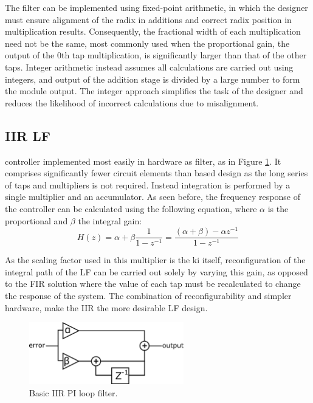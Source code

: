 The filter can be implemented using fixed-point arithmetic, in which the designer must ensure alignment of the radix in additions and correct radix position in multiplication results. Consequently, the fractional width of each multiplication need not be the same, most commonly used when the proportional gain, the output of the 0th tap multiplication, is significantly larger than that of the other taps. Integer arithmetic instead assumes all calculations are carried out using integers, and output of the addition stage is divided by a large number to form the module output. The integer approach simplifies the task of the designer and reduces the likelihood of incorrect calculations due to misalignment.

\subsection{\acs{IIR} \acl{LF}}
 controller implemented most easily in hardware as  filter, as in Figure \ref{fig:iir_pi}. It comprises significantly fewer circuit elements than  based design as the long series of taps and multipliers is not required. Instead integration is performed by a single multiplier and an accumulator. As seen before, the frequency response of the controller can be calculated using the following equation, where $\alpha$ is the proportional and $\beta$ the integral gain:
\begin{equation*}
	H(z) = \alpha + \beta\frac{1}{1-z^{-1}} = \frac{(\alpha + \beta) - \alpha z^{-1}}{1-z^{-1}}
\end{equation*}

As the scaling factor used in this multiplier is the \ac{ki} itself, reconfiguration of the integral path of the \acl{LF} can be carried out solely by varying this gain, as opposed to the \ac{FIR} solution where the value of each tap must be recalculated to change the response of the system. The combination of reconfigurability and simpler hardware, make the \ac{IIR} the more desirable \ac{LF} design.
\begin{figure}[h]
	\centering
	\includegraphics[width=0.6\textwidth]{../simple_pi.pdf}
	\caption[Basic \ac{IIR} \ac{PI} loop filter]{Basic \ac{IIR} \ac{PI} loop filter.}
	\label{fig:iir_pi}
\end{figure}

